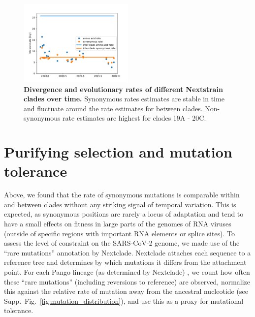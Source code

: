 \documentclass[aps,rmp, twocolumn]{revtex4}
\begin{document}
\begin{figure}
    \includegraphics[width=0.5\textwidth]{figures/rate_progression.pdf}
    \caption{{\bf Divergence and evolutionary rates of different Nextstrain clades over time.} Synonymous rates estimates are stable in time and fluctuate around the rate estimates for between clades. Non-synonymous rate estimates are highest for clades 19A - 20C.
    \label{fig:rate_progression} }
\end{figure}




\section*{Purifying selection and mutation tolerance}

Above, we found that the rate of synonymous mutations is comparable within and between clades without any striking signal of temporal variation.
This is expected, as synonymous positions are rarely a locus of adaptation and tend to have a small effects on fitness in large parts of the genomes of RNA viruses \citep{zanini_vivo_2017} (outside of specific regions with important RNA elements or splice sites).
To assess the level of constraint on the SARS-CoV-2 genome, we made use of the ``rare mutations'' annotation by Nextclade.
Nextclade attaches each sequence to a reference tree and determines by which mutations it differs from the attachment point.
For each Pango lineage (as determined by Nextclade) \citep{rambaut_dynamic_2020,aksamentov_nextclade_2021}, we count how often these ``rare mutations'' (including reversions to reference) are observed, normalize this against the relative rate of mutation away from the ancestral nucleotide (see Supp.~Fig.~\ref{fig:mutation_distribution}), and use this as a proxy for mutational tolerance.
\end{document}
